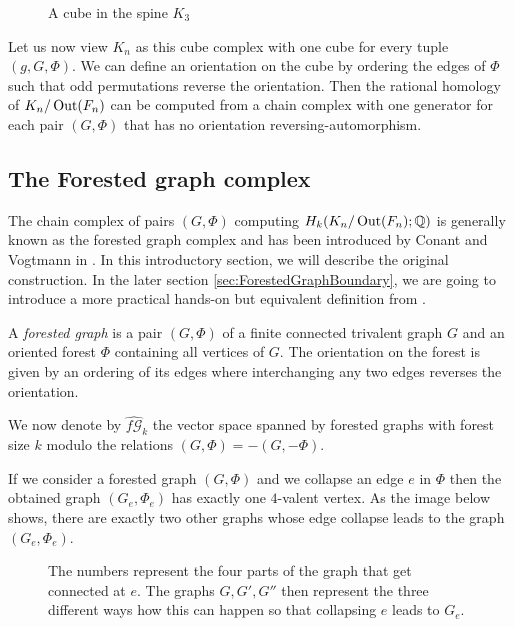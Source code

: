 \begin{figure}[htbp]
	\centering
	\caption{A cube in the spine $K_{3}$}
	\label{fig:spineCube}
\end{figure}
Let us now view $K_{n}$ as this cube complex with one cube for every tuple $(g,G,\Phi)$. 
We can define an orientation on the cube by ordering the edges of $\Phi$ such that odd permutations reverse the orientation. 
Then the rational homology of $K_{n} / \operatorname{Out}(F_{n})$ can be computed from a chain complex with one generator for each pair $(G,\Phi)$ that has no orientation
reversing-automorphism.

\subsection{The Forested graph complex}
The chain complex of pairs $(G,\Phi)$ computing $H_{k}(K_{n} / \operatorname{Out}(F_{n});\mathbb{Q})$ is generally known as the forested graph complex and has been
introduced by Conant and Vogtmann in \cite{conant03}. In this introductory section,
we will describe the original construction. In the later section \ref{sec:ForestedGraphBoundary}, we are going to
introduce a more practical hands-on but equivalent definition from \cite{conant08}.

\begin{definition}
	A \emph{forested graph} is a pair $(G,\Phi)$ of a finite connected trivalent graph $G$ and an oriented forest $\Phi$ containing all vertices of $G$.
	The orientation on the forest is given by an ordering of its edges where interchanging any two edges reverses the orientation.
\end{definition}

We now denote by $\widehat{f\mathcal{G}}_{k}$ the vector space spanned by forested graphs with forest size $k$ modulo the relations
$(G,\Phi) = -(G,-\Phi)$.

If we consider a forested graph $(G,\Phi)$ and we collapse an edge $e$ in $\Phi$ then the obtained graph $(G_{e},\Phi_{e})$ 
has exactly one $4$-valent vertex. As the image below shows, there are exactly two other graphs
whose edge collapse leads to the graph $(G_{e},\Phi_{e})$.

\begin{figure}[bhtp]
	\centering
	\captionsetup{width=0.8\textwidth}
	\caption{The numbers represent the four parts of the graph that get connected at $e$.
		The graphs $G,G',G''$ then represent the three different ways how this can happen so that
	collapsing $e$ leads to $G_{e}$.}
\end{figure}

